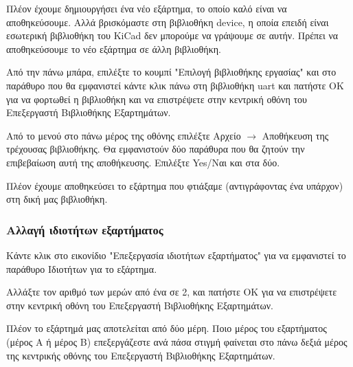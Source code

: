 \documentclass[a4paper]{article}
\begin{document}
Πλέον έχουμε δημιουργήσει ένα νέο εξάρτημα, το οποίο καλό είναι να αποθηκεύσουμε. Αλλά βρισκόμαστε στη βιβλιοθήκη device, η οποία επειδή είναι εσωτερική βιβλιοθήκη του \textenglish{KiCad} δεν μπορούμε να γράψουμε σε αυτήν. Πρέπει να αποθηκεύσουμε το νέο εξάρτημα σε άλλη βιβλιοθήκη.

Από την πάνω μπάρα, επιλέξτε το κουμπί "Επιλογή βιβλιοθήκης εργασίας" %
 και στο παράθυρο που θα εμφανιστεί κάντε κλικ πάνω στη βιβλιοθήκη uart και πατήστε ΟΚ για να φορτωθεί η βιβλιοθήκη και να επιστρέψετε στην κεντρική οθόνη του Επεξεργαστή Βιβλιοθήκης Εξαρτημάτων.

Από το μενού στο πάνω μέρος της οθόνης επιλέξτε Αρχείο $\rightarrow$ Αποθήκευση της τρέχουσας βιβλιοθήκης. Θα εμφανιστούν δύο παράθυρα που θα ζητούν την επιβεβαίωση αυτή της αποθήκευσης. Επιλέξτε Yes/Ναι και στα δύο.

Πλέον έχουμε αποθηκεύσει το εξάρτημα που φτιάξαμε (αντιγράφοντας ένα υπάρχον) στη δική μας βιβλιοθήκη.

\subsubsection{Αλλαγή ιδιοτήτων εξαρτήματος}
Κάντε κλικ στο εικονίδιο "Επεξεργασία ιδιοτήτων εξαρτήματος" %
για να εμφανιστεί το παράθυρο Ιδιοτήτων για το εξάρτημα. 

\begin{figure}
  \begin{center}
    \label{fig:kicad-main}
  \end{center}
\end{figure}

Αλλάξτε τον αριθμό των μερών από ένα σε 2, και πατήστε ΟΚ για να επιστρέψετε στην κεντρική οθόνη του Επεξεργαστή Βιβλιοθήκης Εξαρτημάτων.

Πλέον το εξάρτημά μας αποτελείται από δύο μέρη. Ποιο μέρος του εξαρτήματος (μέρος Α ή μέρος Β) επεξεργάζεστε ανά πάσα στιγμή φαίνεται στο πάνω δεξιά μέρος της κεντρικής οθόνης του Επεξεργαστή Βιβλιοθήκης Εξαρτημάτων.

\begin{figure}
  \begin{center}
    \label{fig:kicad-main}
  \end{center}
\end{figure}
\end{document}
